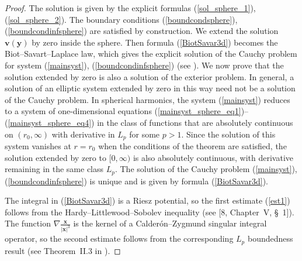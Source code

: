 \documentclass[a4paper]{article}
\newcommand{\bx}{\mathbf{x}}
\newcommand{\bv}{\mathbf{v}}
\newcommand{\by}{\mathbf{y}}
\begin{document}
\begin{proof}
The solution is given by the explicit formulas (\ref{sol_sphere_1}), (\ref{sol_sphere_2}). The boundary conditions (\ref{boundcondsphere}), (\ref{boundcondinfsphere}) are satisfied by construction. 
We extend the solution $\bv(\by)$ by zero inside the sphere. Then formula (\ref{BiotSavar3d}) becomes the Biot--Savart--Laplace law, which gives the explicit solution of the Cauchy problem for system (\ref{mainsyst}), (\ref{boundcondinfsphere}) (see \cite{GallayWayne}). We now prove that the solution extended by zero is also a solution of the exterior problem. In general, a solution of an elliptic system extended by zero in this way need not be a solution of the Cauchy problem. In spherical harmonics, the system (\ref{mainsyst}) reduces to a system of one-dimensional equations (\ref{mainsyst_sphere_eq1})--(\ref{mainsyst_sphere_eq4}) in the class of functions that are absolutely continuous on $(r_0,\infty)$ with derivative in $L_p$ for some $p>1$. Since the solution of this system vanishes at $r=r_0$ when the conditions of the theorem are satisfied, the solution extended by zero to $[0,\infty)$
 is also absolutely continuous, with derivative remaining in the same class $L_p$. The solution of the Cauchy problem (\ref{mainsyst}), (\ref{boundcondinfsphere}) is unique and is given by formula (\ref{BiotSavar3d}).



The integral in (\ref{BiotSavar3d}) is a Riesz potential, so the first estimate (\ref{est1}) follows from the Hardy--Littlewood--Sobolev inequality (see [8, Chapter~V, \S~1]). The function $\nabla\frac{\bx}{|\bx|^3}$ is the kernel of a Calder\'{o}n--Zygmund singular integral operator, so the second estimate follows from the corresponding $L_p$ boundedness result (see Theorem~II.3 in \cite{Calderon}).
\end{proof}
\end{document}
